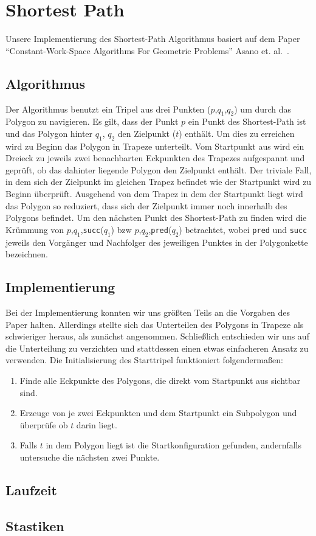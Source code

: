 \section{Shortest Path}
	
Unsere Implementierung des Shortest-Path Algorithmus basiert auf dem Paper \enquote{Constant-Work-Space Algorithms For Geometric Problems} Asano et. al.~\cite{asano11shortestpath}.

\subsection{Algorithmus}

Der Algorithmus benutzt ein Tripel aus drei Punkten ($p$,$q_1$,$q_2$) um durch das Polygon zu navigieren. Es gilt, dass der Punkt $p$ ein Punkt des Shortest-Path ist und das Polygon hinter $q_1$, $q_2$ den Zielpunkt ($t$) enthält.
Um dies zu erreichen wird zu Beginn das Polygon in Trapeze unterteilt. Vom Startpunkt aus wird ein Dreieck zu jeweils zwei benachbarten Eckpunkten des Trapezes aufgespannt und geprüft, ob das dahinter liegende Polygon den Zielpunkt enthält. Der triviale Fall, in dem sich der Zielpunkt im gleichen Trapez befindet wie der Startpunkt wird zu Beginn überprüft.
Ausgehend von dem Trapez in dem der Startpunkt liegt wird das Polygon so reduziert, dass sich der Zielpunkt immer noch innerhalb des Polygons befindet. Um den nächsten Punkt des Shortest-Path zu finden wird die Krümmung von $p$,$q_1$,\texttt{succ}($q_1$) bzw $p$,$q_2$,\texttt{pred}($q_2$) betrachtet, wobei \texttt{pred} und \texttt{succ} jeweils den Vorgänger und Nachfolger des jeweiligen Punktes in der Polygonkette bezeichnen.

\subsection{Implementierung}

Bei der Implementierung konnten wir uns größten Teils an die Vorgaben des Paper halten. Allerdings stellte sich das Unterteilen des Polygons in Trapeze als schwieriger heraus, als zunächst angenommen. Schließlich entschieden wir uns auf die Unterteilung zu verzichten und stattdessen einen etwas einfacheren Ansatz zu verwenden. Die Initialisierung des Starttripel funktioniert folgendermaßen:

\begin{enumerate}
\item Finde alle Eckpunkte des Polygons, die direkt vom Startpunkt aus sichtbar sind.
\item Erzeuge von je zwei Eckpunkten und dem Startpunkt ein Subpolygon und überprüfe ob $t$ darin liegt.
\item Falls $t$ in dem Polygon liegt ist die Startkonfiguration gefunden, andernfalls untersuche die nächsten zwei Punkte.
\end{enumerate}

\subsection{Laufzeit}
\subsection{Stastiken}
